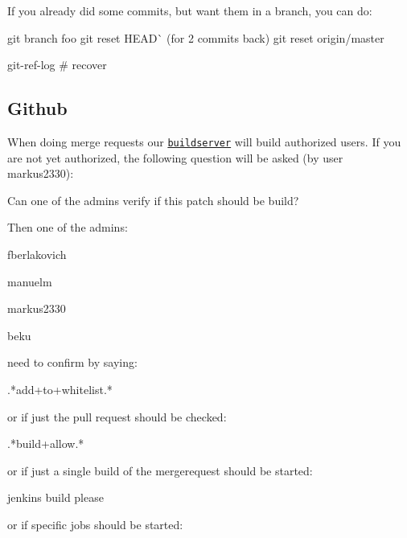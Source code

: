 If you already did some commits, but want them in a branch, you can do\+: \begin{DoxyVerb}    git branch foo
    git reset HEAD^^  (for 2 commits back)
    git reset origin/master

    git-ref-log # recover
\end{DoxyVerb}


\subsection*{Github}

When doing merge requests our \href{https://build.libelektra.org}{\tt buildserver} will build authorized users. If you are not yet authorized, the following question will be asked (by user markus2330)\+: \begin{DoxyVerb}    Can one of the admins verify if this patch should be build?
\end{DoxyVerb}


Then one of the admins\+:


\begin{DoxyItemize}
\item fberlakovich
\item manuelm
\item markus2330
\item beku
\end{DoxyItemize}

need to confirm by saying\+: \begin{DoxyVerb}    .*add\W+to\W+whitelist.*
\end{DoxyVerb}


or if just the pull request should be checked\+: \begin{DoxyVerb}    .*build\W+allow.*
\end{DoxyVerb}


or if just a single build of the mergerequest should be started\+: \begin{DoxyVerb}    jenkins build please
\end{DoxyVerb}


or if specific jobs should be started\+:


